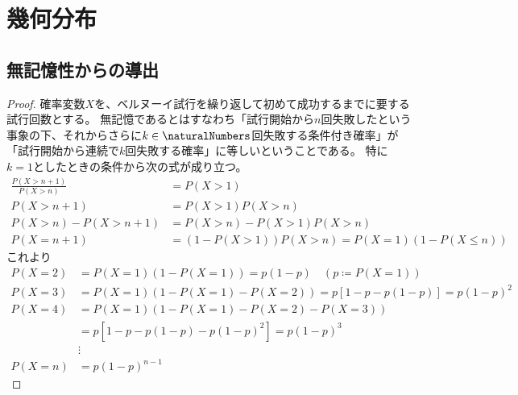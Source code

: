 \chapter{幾何分布}
    \section{無記憶性からの導出}
        \begin{proof}
            \quad\par
            確率変数$X$を、ベルヌーイ試行を繰り返して初めて成功するまでに要する試行回数とする。
            無記憶であるとはすなわち「試行開始から$n$回失敗したという事象の下、それからさらに$k\in\naturalNumbers$回失敗する条件付き確率」が「試行開始から連続で$k$回失敗する確率」に等しいということである。
            特に$k=1$としたときの条件から次の式が成り立つ。
            \begin{align*}
                \frac{P(X>n+1)}{P(X>n)} &= P(X>1) \\
                P(X>n+1) &= P(X>1)P(X>n) \\
                P(X>n) - P(X>n+1) &= P(X>n) - P(X>1)P(X>n) \\
                P(X=n+1) &= (1-P(X>1))P(X>n) = P(X=1)(1-P(X\leq n))
            \end{align*}
            これより
            \begin{align*}
                P(X=2) &= P(X=1)(1 - P(X=1)) = p(1-p) \quad (p \coloneqq P(X=1)) \\
                P(X=3) &= P(X=1)(1 - P(X=1) - P(X=2)) = p[1-p-p(1-p)] = p(1-p)^2 \\
                P(X=4) &= P(X=1)(1 - P(X=1) - P(X=2) - P(X=3)) \\
                &= p[1-p-p(1-p)-p(1-p)^2] = p(1-p)^3 \\
                &\vdots \\
                P(X=n) &= p(1-p)^{n-1}
            \end{align*}
        \end{proof}